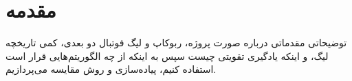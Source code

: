 \chapter{مقدمه}
توضیحاتی مقدماتی درباره صورت پروژه، ربوکاپ و لیگ فوتبال دو بعدی، کمی تاریخچه لیگ، و اینکه یادگیری تقویتی چیست
سپس به اینکه از چه الگوریتم‌هایی قرار است استفاده کنیم، پیاده‌سازی و روش مقایسه می‌پردازیم.


